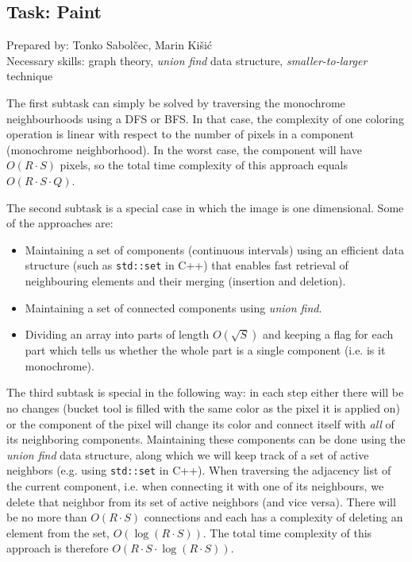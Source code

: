 \subsection*{Task: Paint}
\textsf{Prepared by: Tonko Sabolčec, Marin Kišić}\\
\textsf{Necessary skills: graph theory, \textit{union find} data structure,
\textit{smaller-to-larger} technique}

The first subtask can simply be solved by traversing the monochrome
neighbourhoods using a DFS or BFS. In that case, the complexity of one coloring
operation is linear with respect to the number of pixels in a component
(monochrome neighborhood).  In the worst case, the component will have $O(R
\cdot S)$ pixels, so the total time complexity of this approach equals $O(R
\cdot S \cdot Q)$.

The second subtask is a special case in which the image is one dimensional.
Some of the approaches are:
\begin{itemize}[topsep=0pt]
  \item Maintaining a set of components (continuous intervals) using an
        efficient data structure (such as \verb|std::set| in C++) that enables fast
        retrieval of neighbouring elements and their merging (insertion and deletion).
  \item Maintaining a set of connected components using \textit{union find}.
  \item Dividing an array into parts of length $O(\sqrt{S})$ and keeping a flag
        for each part which tells us whether the whole part is a single component
        (i.e. is it monochrome).
\end{itemize}

The third subtask is special in the following way: in each step either there
will be no changes (bucket tool is filled with the same color as the pixel it
is applied on) or the component of the pixel will change its color and connect
itself with \textit{all} of its neighboring components. Maintaining these
components can be done using the \textit{union find} data structure, along
which we will keep track of a set of active neighbors (e.g. using
\verb|std::set| in C++). When traversing the adjacency list of the current
component, i.e. when connecting it with one of its neighbours, we delete that
neighbor from its set of active neighbors (and vice versa). There will be
no more than $O(R \cdot S)$ connections and each has a complexity of deleting
an element from the set, $O(\log (R \cdot S))$. The total time complexity of
this approach is therefore $O(R \cdot S \cdot \log (R \cdot S))$.

